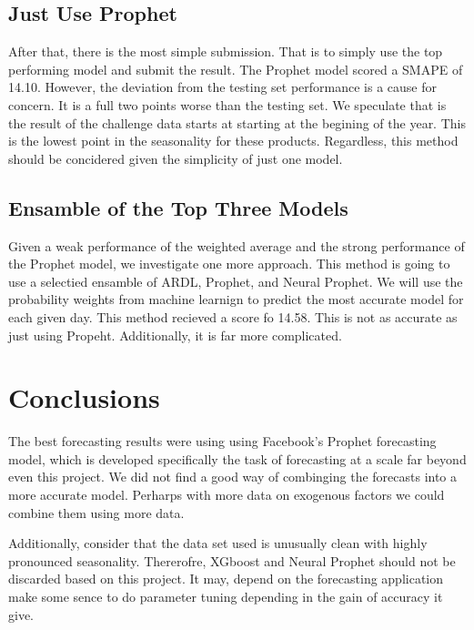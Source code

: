 \documentclass[16pt,twocolumn,letterpaper]{article}
\begin{document}
\subsection{Just Use Prophet}

After that, there is the most simple submission. That is to simply use the top performing model and submit the result. The Prophet model scored a SMAPE of 14.10. However, the deviation from the testing set performance is a cause for concern. It is a full two points worse than the testing set. We speculate that is the result of the challenge data starts at starting at the begining of the year. This is the lowest point in the seasonality for these products. Regardless, this method should be concidered given the simplicity of just one model. 

\subsection{Ensamble of the Top Three Models}

Given a weak performance of the weighted average and the strong performance of the Prophet model, we investigate one more approach. This method is going to use a selectied ensamble of ARDL, Prophet, and Neural Prophet. We will use the probability weights from machine learnign to predict the most accurate model for each given day. This method recieved a score fo 14.58. This is not as accurate as just using Propeht. Additionally, it is far more complicated. 

\section{Conclusions}

The best forecasting results were using using Facebook's Prophet forecasting model, which is developed specifically the task of forecasting at a scale far beyond even this project. We did not find a good way of combinging the forecasts into a more accurate model. Perharps with more data on exogenous factors we could combine them using more data.  

Additionally, consider that the data set used is unusually clean with highly pronounced seasonality. Thererofre, XGboost and Neural Prophet should not be discarded based on this project. It may, depend on the forecasting application make some sence to do parameter tuning depending in the gain of accuracy it give.

\clearpage
\onecolumn


\end{document}
